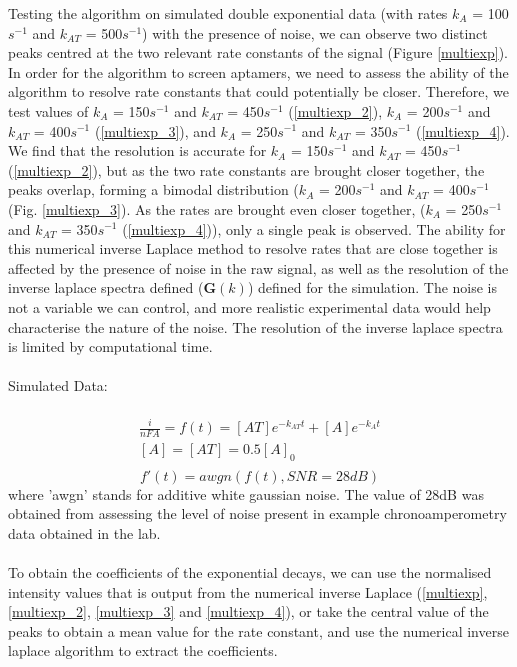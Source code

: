 Testing the algorithm on simulated double exponential data (with rates $k_{A}$ = 100$s^{-1}$ and $k_{AT}$ = 500$s^{-1}$) with the presence of noise, we can observe two distinct peaks centred at the two relevant rate constants of the signal (Figure \ref{multiexp}). In order for the algorithm to screen aptamers, we need to assess the ability of the algorithm to resolve rate constants that could potentially be closer. Therefore, we test values of $k_{A}$ = 150$s^{-1}$ and $k_{AT}$ = 450$s^{-1}$ (\autoref{multiexp_2}), $k_{A}$ = 200$s^{-1}$ and $k_{AT}$ = 400$s^{-1}$ (\autoref{multiexp_3}), and $k_{A}$ = 250$s^{-1}$ and $k_{AT}$ = 350$s^{-1}$ (\autoref{multiexp_4}). We find that the resolution is accurate for $k_{A}$ = 150$s^{-1}$ and $k_{AT}$ = 450$s^{-1}$ (\autoref{multiexp_2}), but as the two rate constants are brought closer together, the peaks overlap, forming a bimodal distribution ($k_{A}$ = 200$s^{-1}$ and $k_{AT}$ = 400$s^{-1}$ (Fig. \ref{multiexp_3}). As the rates are brought even closer together, ($k_{A}$ = 250$s^{-1}$ and $k_{AT}$ = 350$s^{-1}$ (\autoref{multiexp_4})), only a single peak is observed. The ability for this numerical inverse Laplace method to resolve rates that are close together is affected by the presence of noise in the raw signal, as well as the resolution of the inverse laplace spectra defined ($\mathbf{G}(k)$) defined for the simulation. The noise is not a variable we can control, and more realistic experimental data would help characterise the nature of the noise. The resolution of the inverse laplace spectra is limited by computational time.\\\\
Simulated Data:\\\\
\abovedisplayskip=0pt\relax
\begin{multline}
     \frac{i}{nFA} = f(t) =  [AT]e^{-k_{AT}t} + [A]e^{-k_{A}t}  \\
     [A] = [AT] = 0.5[A]_{0} \\
\end{multline}
\belowdisplayskip=0pt\relax
\begin{equation}
     f'(t) = awgn(f(t),SNR = 28dB)
\end{equation}
where 'awgn' stands for additive white gaussian noise. The value of 28dB was obtained from assessing the level of noise present in example chronoamperometry data obtained in the lab.\\\\
To obtain the coefficients of the exponential decays, we can use the normalised intensity values that is output from the numerical inverse Laplace (\autoref{multiexp}, \ref{multiexp_2}, \ref{multiexp_3} and \ref{multiexp_4}), or take the central value of the peaks to obtain a mean value for the rate constant, and use the numerical inverse laplace algorithm to extract the coefficients.
